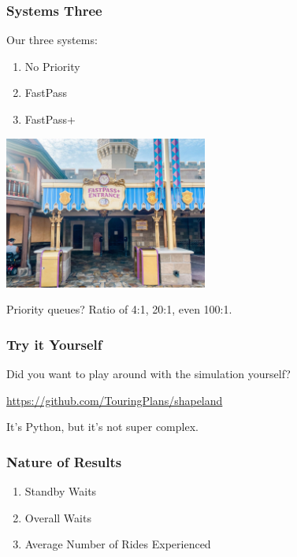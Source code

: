 \begin{frame}
\frametitle{Systems Three}

Our three systems:

\begin{enumerate}
	\item No Priority 
	\item FastPass
	\item FastPass+
\end{enumerate}

\begin{center}
	\includegraphics[width=0.5\textwidth]{images/fastpasslane.jpg}
\end{center}

Priority queues? Ratio of 4:1, 20:1, even 100:1.

\end{frame}


\begin{frame}
\frametitle{Try it Yourself}

Did you want to play around with the simulation yourself? 

\url{https://github.com/TouringPlans/shapeland}

It's Python, but it's not super complex.

\end{frame}

\begin{frame}
\frametitle{Nature of Results}

\begin{enumerate}
	\item Standby Waits
	\item Overall Waits
	\item Average Number of Rides Experienced
\end{enumerate}


\end{frame}


